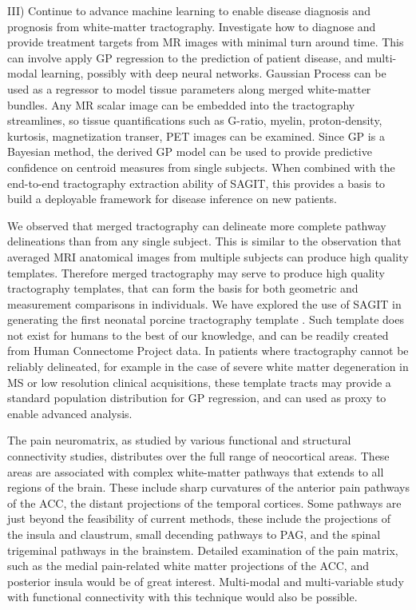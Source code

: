 III) Continue to advance machine learning to enable disease diagnosis and prognosis from white-matter tractography. Investigate how to diagnose and provide treatment targets from MR images with minimal turn around time. This can involve apply GP regression to the prediction of patient disease, and multi-modal learning, possibly with deep neural networks. Gaussian Process can be used as a regressor to model tissue parameters along merged white-matter bundles. Any MR scalar image can be embedded into the tractography streamlines, so tissue quantifications such as G-ratio, myelin, proton-density, kurtosis, magnetization transer, PET images can be examined. Since GP is a Bayesian method, the derived GP model can be used to provide predictive confidence on centroid measures from single subjects. When combined with the end-to-end tractography extraction ability of SAGIT, this provides a basis to build a deployable framework for disease inference on new patients. 


We observed that merged tractography can delineate more complete pathway delineations than from any single subject. This is similar to the observation that averaged MRI anatomical images from multiple subjects can produce high quality templates. Therefore merged tractography may serve to produce high quality tractography templates, that can form the basis for both geometric and measurement comparisons in individuals. We have explored the use of SAGIT in generating the first neonatal porcine tractography template \cite{Zhong2016a}. Such template does not exist for humans to the best of our knowledge, and can be readily created from Human Connectome Project data. In patients where tractography cannot be reliably delineated, for example in the case of severe white matter degeneration in MS or low resolution clinical acquisitions, these template tracts may provide a standard population distribution for GP regression, and can used as proxy to enable advanced analysis.

The pain neuromatrix, as studied by various functional and structural connectivity studies, distributes over the full range of neocortical areas. These areas are associated with complex white-matter pathways that extends to all regions of the brain. These include sharp curvatures of the anterior pain pathways of the ACC, the distant projections of the temporal cortices. Some pathways are just beyond the feasibility of current methods, these include the projections of the insula and claustrum, small decending pathways to PAG, and the spinal trigeminal pathways in the brainstem. Detailed examination of the pain matrix, such as the medial pain-related white matter projections of the ACC, and posterior insula would be of great interest. Multi-modal and multi-variable study with functional connectivity with this technique would also be possible. 


